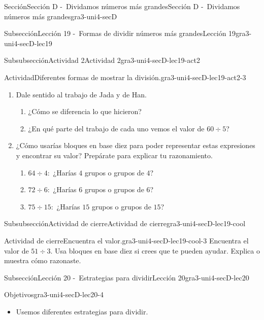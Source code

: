 \documentclass[twoside,14pt,]{extarticle}
\begin{document}
\begin{sectionptx}{Sección}{Sección D -~Dividamos números más grandes}{}{Sección D -~Dividamos números más grandes}{}{}{gra3-uni4-secD}
\begin{subsectionptx}{Subsección}{Lección 19 -~Formas de dividir números más grandes}{}{Lección 19}{}{}{gra3-uni4-secD-lec19}
\begin{subsubsectionptx}{Subsubsección}{Actividad 2}{}{Actividad 2}{}{}{gra3-uni4-secD-lec19-act2}
\begin{activity}{Actividad}{Diferentes formas de mostrar la división.}{gra3-uni4-secD-lec19-act2-3}
\begin{enumerate}
\item{}Dale sentido al trabajo de Jada y de Han.%
%
\begin{enumerate}
\item{}¿Cómo se diferencia lo que hicieron?%
\item{}¿En qué parte del trabajo de cada uno vemos el valor de \(60 \div 5\)?%
\end{enumerate}
\item{}¿Cómo usarías bloques en base diez para poder representar estas expresiones y encontrar su valor? Prepárate para explicar tu razonamiento.%
%
\begin{enumerate}
\item{}\(64 \div 4:\) ¿Harías \(4\) grupos o grupos de \(4\)?%
\item{}\(72 \div 6:\) ¿Harías \(6\) grupos o grupos de \(6\)?%
\item{}\(75 \div 15:\) ¿Harías \(15\) grupos o grupos de \(15\)?%
\end{enumerate}
\end{enumerate}
\end{activity}%
\end{subsubsectionptx}
%
%
\typeout{************************************************}
\typeout{************************************************}
%
\begin{subsubsectionptx}{Subsubsección}{Actividad de cierre}{}{Actividad de cierre}{}{}{gra3-uni4-secD-lec19-cool}
\begin{project}{Actividad de cierre}{Encuentra el valor.}{gra3-uni4-secD-lec19-cool-3}%
Encuentra el valor de \(51 \div 3.\) Usa bloques en base diez si crees que te pueden ayudar. Explica o muestra cómo razonaste.%
\end{project}%
\end{subsubsectionptx}
\end{subsectionptx}
%
%
\typeout{************************************************}
\typeout{************************************************}
%
\begin{subsectionptx}{Subsección}{Lección 20 -~Estrategias para dividir}{}{Lección 20}{}{}{gra3-uni4-secD-lec20}
\begin{objectives}{Objetivos}{gra3-uni4-secD-lec20-4}
%
\begin{itemize}[label=\textbullet]
\item{}Usemos diferentes estrategias para dividir.%
\end{itemize}

\end{objectives}
\end{subsectionptx}
\end{sectionptx}
\end{document}
